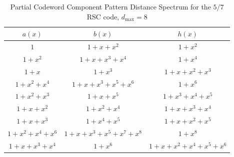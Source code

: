 \begin{table}[htbp]
 \caption{Partial Codeword Component Pattern Distance Spectrum for the $5/7$ RSC code, $d_{\text{max}}=8$}
\centering
 \begin{tabular}{c c c} 
 \hline
 $a(x)$ & $b(x)$ & $h(x)$ \\ [0.5ex] 
 \hline\hline
$1$ & $1+x+x^{2}$ & $1+x^2$\\
\hline
$1+x^2$ & $1+x+x^3+x^4$ & $1+x^{4}$\\
\hline
$1+x$ & $1+x^3$ & $1+x+x^2+x^3$\\
\hline
$1+x^2+x^4$ & $1+x+x^3+x^5+x^6$ & $1+x^{6}$\\
\hline
$1+x^2+x^3$ & $1+x+x^5$ & $1+x^3+x^4+x^5$\\
\hline
$1+x+x^2$ & $1+x^2+x^4$ & $1+x+x^3+x^4$\\
\hline
$1+x+x^3$ & $1+x^4+x^5$ & $1+x+x^2+x^5$\\
\hline
$1+x^2+x^4+x^6$ & $1+x+x^3+x^5+x^7+x^8$ & $1+x^8$\\
\hline
$1+x+x^3+x^4$ & $1+x^6$ & $1+x+x^2+x^4+x^5+x^6$\\
 \end{tabular}
 
 \label{novelTab13}
\end{table}

